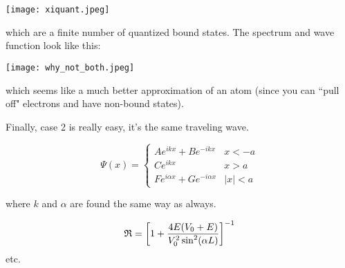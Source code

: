 \texttt{[image: xiquant.jpeg]}

which are a finite number of quantized bound states. The spectrum
and wave function look like this:

\texttt{[image: why\_not\_both.jpeg]}

which seems like a much better approximation of an atom (since you can ``pull off" electrons
and have non-bound states).

Finally, case 2 is really easy, it's the same traveling wave.

\[
    \Psi(x) = \begin{cases}
        Ae^{ikx} + Be^{-ikx} & x < -a \\
        Ce^{ikx} & x > a \\
        Fe^{i \alpha x} + Ge^{-i\alpha x} & |x| < a
    \end{cases} \]

where $k$ and $\alpha$ are found the same way as always.

\[ \mathfrak{R} = \qty[1 + \frac{4E(V_0 + E)}{V_0^2 \sin^2(\alpha L)}]^{-1} \]
etc.